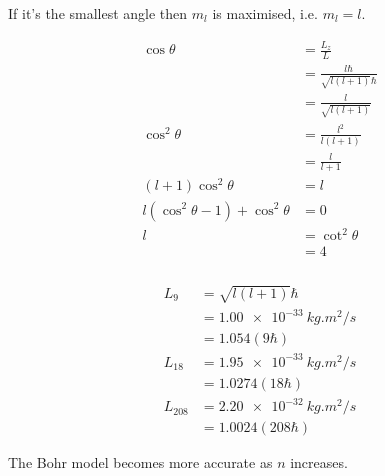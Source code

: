 \documentclass{article}
\begin{document}
\setcounter{subsubsection}{10}
\subsubsection{}

If it's the smallest angle then $m_l$ is maximised, i.e. $m_l = l$.

\begin{align*}
  \cos \theta                           & = \frac{L_z}{L}                          \\
                                        & = \frac{l \hbar}{\sqrt{l (l + 1)} \hbar} \\
                                        & = \frac{l}{\sqrt{l (l + 1)}}             \\
  \cos^2 \theta                         & = \frac{l^2}{l (l + 1)}                  \\
                                        & = \frac{l}{l + 1}                        \\
  (l + 1) \cos^2 \theta                 & = l                                      \\
  l (\cos^2 \theta - 1) + \cos^2 \theta & = 0                                      \\
  l                                     & = \cot^2 \theta                          \\
                                        & = 4
\end{align*}

\setcounter{subsubsection}{12}
\subsubsection{}

\begin{align*}
  L_9     & = \sqrt{l (l + 1)} \hbar   \\
          & = \qty{1.00e-33}{kg.m^2/s} \\
          & = 1.054 (9 \hbar)          \\
  L_{18}  & = \qty{1.95e-33}{kg.m^2/s} \\
          & = 1.0274 (18 \hbar)        \\
  L_{208} & = \qty{2.20e-32}{kg.m^2/s} \\
          & = 1.0024 (208 \hbar)
\end{align*}

The Bohr model becomes more accurate as $n$ increases.

\setcounter{subsubsection}{14}
\end{document}
